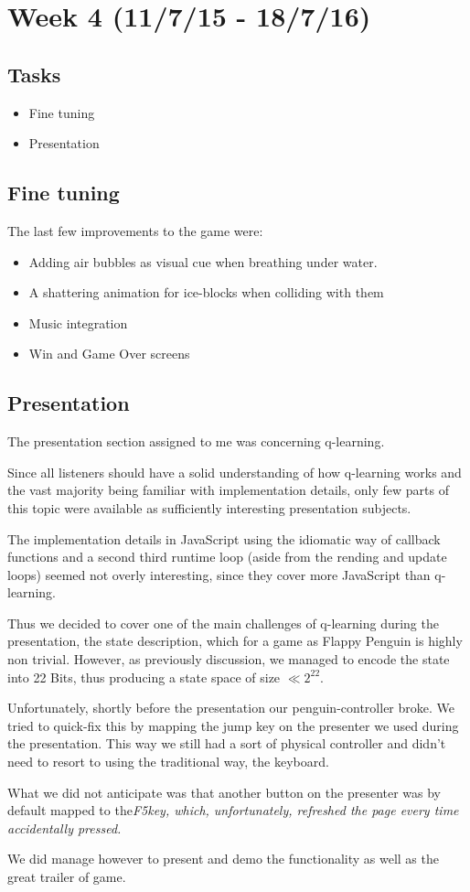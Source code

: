 \documentclass{article}
\begin{document}
\section{Week 4 (11/7/15 - 18/7/16)}
    \subsection{Tasks}
    \begin{itemize}
        \item Fine tuning
        \item Presentation
    \end{itemize}
    \subsection{Fine tuning}
        The last few improvements to the game were:
        \begin{itemize}
            \item Adding air bubbles as visual cue when breathing under water.
            \item A shattering animation for ice-blocks when colliding with them
            \item Music integration
            \item Win and Game Over screens
        \end{itemize}

    \subsection{Presentation}
        The presentation section assigned to me was concerning q-learning.

        Since all listeners should have a solid understanding of how q-learning works and the vast majority being familiar with implementation details, only few parts of this topic were available as sufficiently interesting presentation subjects.

        The implementation details in JavaScript using the idiomatic way of callback functions and a second third runtime loop (aside from the rending and update loops) seemed not overly interesting, since they cover more JavaScript than q-learning.

        Thus we decided to cover one of the main challenges of q-learning during the presentation, the state description, which for a game as Flappy Penguin is highly non trivial.
        However, as previously discussion, we managed to encode the state into 22 Bits, thus producing a state space of size $\ll 2^22$.

        Unfortunately, shortly before the presentation our penguin-controller broke. We tried to quick-fix this by mapping the jump key on the presenter we used during the presentation. This way we still had a sort of physical controller and didn't need to resort to using the traditional way, the keyboard.

        What we did not anticipate was that another button on the presenter was by default mapped to the\em F5\em key, which, unfortunately, refreshed the page every time accidentally pressed.

        We did manage however to present and demo the functionality as well as the great trailer of game.
\end{document}
